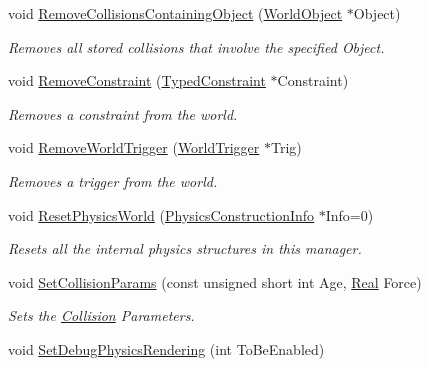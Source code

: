 \begin{DoxyCompactItemize}
void \hyperlink{classMezzanine_1_1PhysicsManager_ade3423f416ddeeafcde5e89d6edcd221}{RemoveCollisionsContainingObject} (\hyperlink{classMezzanine_1_1WorldObject}{WorldObject} $\ast$Object)
\begin{DoxyCompactList}\small\item\em Removes all stored collisions that involve the specified Object. \item\end{DoxyCompactList}\item 
void \hyperlink{classMezzanine_1_1PhysicsManager_a78713bb51e2d3247964647bc35f166f8}{RemoveConstraint} (\hyperlink{classMezzanine_1_1TypedConstraint}{TypedConstraint} $\ast$Constraint)
\begin{DoxyCompactList}\small\item\em Removes a constraint from the world. \item\end{DoxyCompactList}\item 
void \hyperlink{classMezzanine_1_1PhysicsManager_ab3d96f132ab95690c520348f986140b8}{RemoveWorldTrigger} (\hyperlink{classMezzanine_1_1WorldTrigger}{WorldTrigger} $\ast$Trig)
\begin{DoxyCompactList}\small\item\em Removes a trigger from the world. \item\end{DoxyCompactList}\item 
void \hyperlink{classMezzanine_1_1PhysicsManager_aa4333ad1d8382ead2401e2870603ae89}{ResetPhysicsWorld} (\hyperlink{classMezzanine_1_1PhysicsConstructionInfo}{PhysicsConstructionInfo} $\ast$Info=0)
\begin{DoxyCompactList}\small\item\em Resets all the internal physics structures in this manager. \item\end{DoxyCompactList}\item 
void \hyperlink{classMezzanine_1_1PhysicsManager_acda375c8effd99c6bb01f2aeb0e55741}{SetCollisionParams} (const unsigned short int Age, \hyperlink{namespaceMezzanine_a726731b1a7df72bf3583e4a97282c6f6}{Real} Force)
\begin{DoxyCompactList}\small\item\em Sets the \hyperlink{classMezzanine_1_1Collision}{Collision} Parameters. \item\end{DoxyCompactList}\item 
void \hyperlink{classMezzanine_1_1PhysicsManager_ac1104ad21c6c779bb93147163d066f7e}{SetDebugPhysicsRendering} (int ToBeEnabled)

\end{DoxyCompactItemize}
